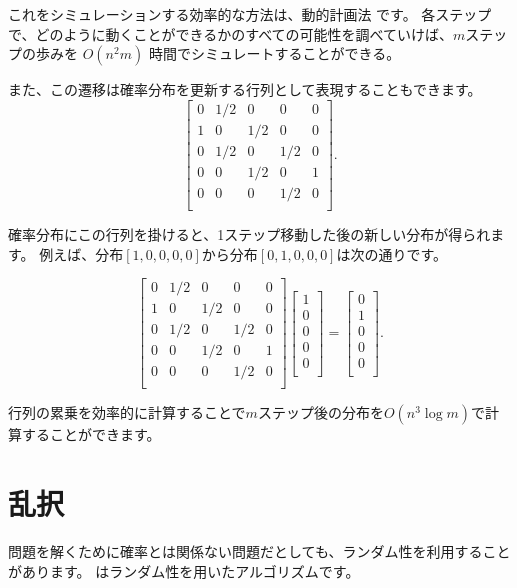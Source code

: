 これをシミュレーションする効率的な方法は、動的計画法 です。
各ステップで、どのように動くことができるかのすべての可能性を調べていけば、$m$ステップの歩みを $O(n^2 m)$ 時間でシミュレートすることができる。

また、この遷移は確率分布を更新する行列として表現することもできます。
\[
 \begin{bmatrix}
  0 & 1/2 & 0 & 0 & 0 \\
  1 & 0 & 1/2 & 0 & 0 \\
  0 & 1/2 & 0 & 1/2 & 0 \\
  0 & 0 & 1/2 & 0 & 1 \\
  0 & 0 & 0 & 1/2 & 0 \\
 \end{bmatrix}.
\]

確率分布にこの行列を掛けると、1ステップ移動した後の新しい分布が得られます。
例えば、分布$[1,0,0,0,0]$から分布$[0,1,0,0,0]$は次の通りです。

\[
 \begin{bmatrix}
  0 & 1/2 & 0 & 0 & 0 \\
  1 & 0 & 1/2 & 0 & 0 \\
  0 & 1/2 & 0 & 1/2 & 0 \\
  0 & 0 & 1/2 & 0 & 1 \\
  0 & 0 & 0 & 1/2 & 0 \\
 \end{bmatrix}
 \begin{bmatrix}
  1 \\
  0 \\
  0 \\
  0 \\
  0 \\
 \end{bmatrix}
=
 \begin{bmatrix}
  0 \\
  1 \\
  0 \\
  0 \\
  0 \\
 \end{bmatrix}.
\]

行列の累乗を効率的に計算することで$m$ステップ後の分布を$O(n^3 \log m)$で計算することができます。

\section{乱択}


問題を解くために確率とは関係ない問題だとしても、ランダム性を利用することがあります。
はランダム性を用いたアルゴリズムです。


